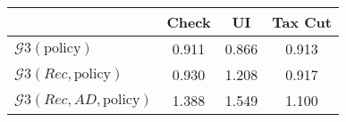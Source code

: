 \begin{tabular}{@{}lccc@{}} 
\toprule 
                          & Check      & UI    & Tax Cut    \\  \midrule 
$\mathcal{G}3(\text{policy})$ & 0.911  & 0.866  & 0.913     \\ 
$\mathcal{G}3(Rec,\text{policy})$ & 0.930  & 1.208  & 0.917     \\ 
$\mathcal{G}3(Rec, AD,\text{policy})$ & 1.388  & 1.549  & 1.100     \\ 
\end{tabular}  
